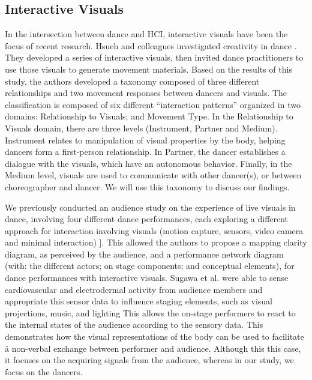 \subsection{Interactive Visuals}

In the intersection between dance and HCI, interactive visuals have been the focus of recent research. Hsueh and colleagues investigated creativity in dance \cite{hsueh_understanding_2019}. They developed a series of interactive visuals, then invited dance practitioners to use those visuals to generate movement materials. Based on the results of this study, the authors developed a taxonomy composed of three different relationships and two movement responses between dancers and visuals. The classification is composed of six different “interaction patterns” organized in two domains: Relationship to Visuals; and Movement Type. In the Relationship to Visuals domain, there are three levels (Instrument, Partner and Medium). Instrument relates to manipulation of visual properties by the body, helping dancers form a first-person relationship. In Partner, the dancer establishes a dialogue with the visuals, which have an autonomous behavior. Finally, in the Medium level, visuals are used to communicate with other dancer(s), or between choreographer and dancer. We will use this taxonomy to discuss our findings.

We previously conducted an audience study on the experience of live visuals in dance, involving four different dance performances, each exploring a different approach for interaction involving visuals (motion capture, sensors, video camera and minimal interaction) \cite{correia_connected_2021}]. This allowed the authors to propose a mapping clarity diagram, as perceived by the audience, and a performance network diagram (with: the different actors; on stage components; and conceptual elements), for dance performances with interactive visuals. Sugawa et al. were able to sense cardiovascular and electrodermal activity from audience members and appropriate this sensor data to influence staging elements, such as visual projections, music, and lighting \cite{sugawa_boiling_2021} This allows the on-stage performers to react to the internal states of the audience according to the sensory data. This demonstrates how the visual representations of the body can be used to facilitate å non-verbal exchange between performer and audience. Although this this case, it focuses on the acquiring signals from the audience, whereas in our study, we focus on the dancers.

